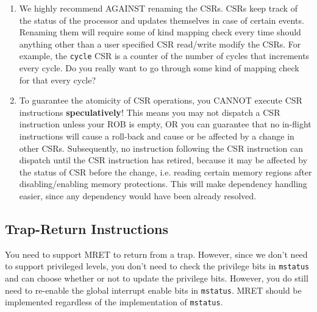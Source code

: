\documentclass{article}
\begin{document}
\begin{enumerate}
    \item We highly recommend AGAINST renaming the CSRs. CSRs keep track of the status of the processor and updates themselves in case of certain events. Renaming them will require some of kind mapping check every time should anything other than a user specified CSR read/write modify the CSRs. For example, the \texttt{cycle} CSR is a counter of the number of cycles that increments every cycle. Do you really want to go through some kind of mapping check for that every cycle?
    \item To guarantee the atomicity of CSR operations, you CANNOT execute CSR instructions \textbf{speculatively}! This means you may not dispatch a CSR instruction unless your ROB is empty, OR you can guarantee that no in-flight instructions will cause a roll-back and cause or be affected by a change in other CSRs. Subsequently, no instruction following the CSR instruction can dispatch until the CSR instruction has retired, because it may be affected by the status of CSR before the change, i.e. reading certain memory regions after disabling/enabling memory protections. This will make dependency handling easier, since any dependency would have been already resolved.
\end{enumerate}

\subsection{Trap-Return Instructions}
You need to support MRET to return from a trap. However, since we don't need to support privileged levels, you don't need to check the privilege bits in \texttt{mstatus} and can choose whether or not to update the privilege bits. However, you do still need to re-enable the global interrupt enable bits in \texttt{mstatus}. MRET should be implemented regardless of the implementation of \texttt{mstatus}.
\end{document}
